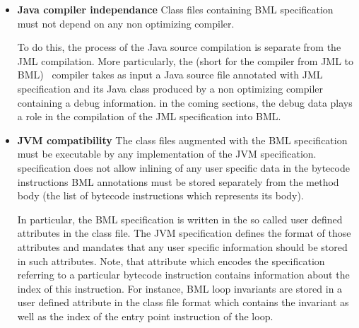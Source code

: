 \documentclass[a4paper]{llncs}
\begin{document}
\begin{itemize}
\item \textbf{Java compiler independance } 
Class files containing BML specification must not depend on any non
optimizing compiler.
    
      To do this, the process of the Java source compilation is
      separate from the JML compilation. More particularly, the
      \JMLtoBML (short for the compiler from JML to BML) \ compiler
      takes as input a Java source file annotated with JML
      specification and its Java class produced by a non optimizing
      compiler containing a debug information.%
      in the coming sections, the debug data plays a role in the
      compilation of the JML specification into BML.
      

\item \textbf{JVM compatibility } 
            The class files augmented with the BML specification must
            be executable by any implementation of the JVM
            specification.  %
            specification does not allow inlining of any user specific
            data in the bytecode instructions BML annotations must be
            stored separately from the method body (the list of
            bytecode instructions which represents its body).
	  
	    

In particular, the BML specification is written in the so called user
defined attributes in the class file.  The JVM specification defines
the format of those attributes and mandates that any user specific
information should be stored in such attributes. Note, that attribute
which encodes the specification referring to a particular bytecode
instruction contains information about the index of this
instruction. For instance, BML loop invariants are stored in a user
defined attribute in the class file format which contains the
invariant as well as the index of the entry point instruction of the
loop.
	    

\end{itemize}
\end{document}
